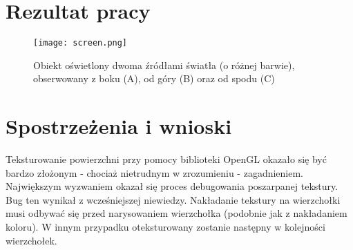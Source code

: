 \documentclass[a4paper,11pt]{article}
\begin{document}

\section{Rezultat pracy}

\begin{figure}[h!]
    \centering
    \texttt{[image: screen.png]}
    \caption{Obiekt oświetlony dwoma źródłami światła (o różnej barwie), obserwowany z boku (A), od góry (B) oraz od spodu (C)}
    \label{fig:screen1}
\end{figure}

\newpage


\section{Spostrzeżenia i wnioski}
Teksturowanie powierzchni przy pomocy biblioteki OpenGL okazało się być bardzo złożonym - chociaż nietrudnym w zrozumieniu - zagadnieniem. Największym wyzwaniem okazał się proces debugowania poszarpanej tekstury. Bug ten wynikał z wcześniejszej niewiedzy. Nakładanie tekstury na wierzchołki musi odbywać się przed narysowaniem wierzchołka (podobnie jak z nakładaniem koloru). W innym przypadku oteksturowany zostanie następny w kolejności wierzchołek.
\end{document}
